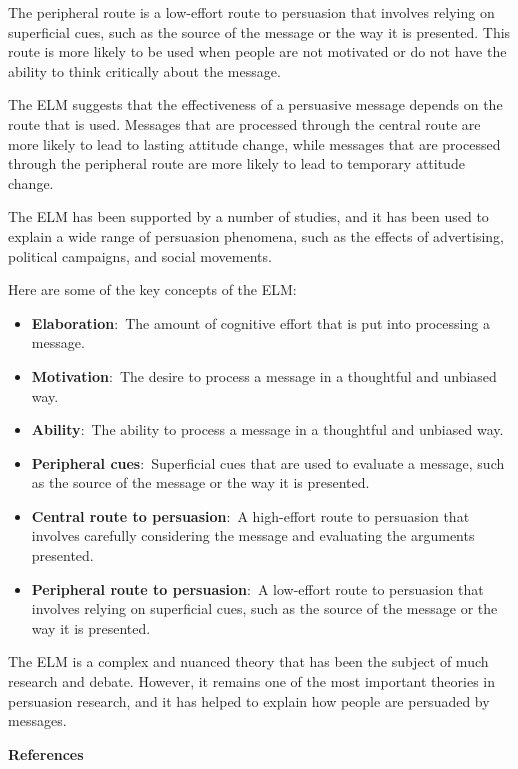 \documentclass[
  b5paper]{book}
\begin{document}
The peripheral route is a low-effort route to persuasion that involves relying on superficial cues, such as the source of the message or the way it is presented. This route is more likely to be used when people are not motivated or do not have the ability to think critically about the message.

The ELM suggests that the effectiveness of a persuasive message depends on the route that is used. Messages that are processed through the central route are more likely to lead to lasting attitude change, while messages that are processed through the peripheral route are more likely to lead to temporary attitude change.

The ELM has been supported by a number of studies, and it has been used to explain a wide range of persuasion phenomena, such as the effects of advertising, political campaigns, and social movements.

Here are some of the key concepts of the ELM:

\begin{itemize}
\item
  \textbf{Elaboration}:~The amount of cognitive effort that is put into processing a message.
\item
  \textbf{Motivation}:~The desire to process a message in a thoughtful and unbiased way.
\item
  \textbf{Ability}:~The ability to process a message in a thoughtful and unbiased way.
\item
  \textbf{Peripheral cues}:~Superficial cues that are used to evaluate a message, such as the source of the message or the way it is presented.
\item
  \textbf{Central route to persuasion}:~A high-effort route to persuasion that involves carefully considering the message and evaluating the arguments presented.
\item
  \textbf{Peripheral route to persuasion}:~A low-effort route to persuasion that involves relying on superficial cues, such as the source of the message or the way it is presented.
\end{itemize}

The ELM is a complex and nuanced theory that has been the subject of much research and debate. However, it remains one of the most important theories in persuasion research, and it has helped to explain how people are persuaded by messages.

\textbf{References}
\end{document}
